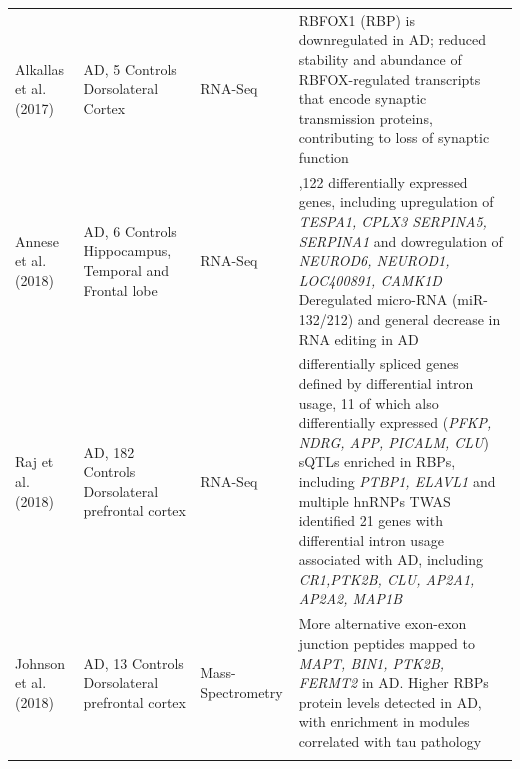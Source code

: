 \begin{changemargin}{1.5cm}
\begin{landscape}
\begin{longtable}[c]{p{3cm}p{4cm}p{3cm}p{16cm}}
			\centering Alkallas et al. (2017)\cite{Alkallas2017} &
			\centering 6 AD, 5 Controls \newline Dorsolateral Cortex &
			\centering RNA-Seq &
			\tabitem RBFOX1 (RBP) is downregulated in AD; reduced stability and abundance of RBFOX-regulated transcripts that encode synaptic transmission proteins, contributing to loss of synaptic function	\\
			\hdashline[0.5pt/5pt]
			
			\centering Annese et al. (2018)\cite{Annese2018} &
			\centering 6 AD, 6 Controls \newline Hippocampus, Temporal and Frontal lobe &
			\centering RNA-Seq &
			\tabitem 2,122 differentially expressed genes, including upregulation of \textit{TESPA1, CPLX3 SERPINA5, SERPINA1} and dowregulation of \textit{NEUROD6, NEUROD1, LOC400891, CAMK1D} \newline
			\tabitem Deregulated micro-RNA (miR-132/212) and general decrease in RNA editing in AD \\
			\hdashline[0.5pt/5pt]
			
			\centering Raj et al. \newline (2018)\cite{Raj2018} &
			\centering 268 AD, 182 Controls \newline Dorsolateral prefrontal cortex &
			\centering RNA-Seq &
			\tabitem 84 differentially spliced genes defined by differential intron usage, 11 of which also differentially expressed (\textit{PFKP, NDRG, APP, PICALM, CLU}) \newline
			\tabitem sQTLs enriched in RBPs, including \textit{PTBP1, ELAVL1} and multiple hnRNPs \newline
			\tabitem TWAS identified 21 genes with differential intron usage associated with AD, including \textit{CR1,PTK2B, CLU, AP2A1, AP2A2, MAP1B} \\
			\hdashline[0.5pt/5pt]
			
			\centering Johnson et al. \newline (2018)\cite{Johnson2018} &
			\centering 20 AD, 13 Controls \newline Dorsolateral prefrontal cortex &
			\centering Mass-Spectrometry &
			\tabitem More alternative exon-exon junction peptides mapped to \textit{MAPT, BIN1, PTK2B, FERMT2} in AD. \newline 
			\tabitem Higher RBPs protein levels detected in AD, with enrichment in modules correlated with tau pathology \\
			\hdashline[0.5pt/5pt]	
			

\end{longtable}
\end{landscape}
\end{changemargin}

